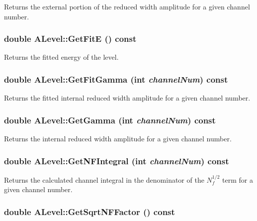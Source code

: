 Returns the external portion of the reduced width amplitude for a given channel number. 
\subsubsection{\setlength{\rightskip}{0pt plus 5cm}double ALevel::Get\-Fit\-E () const}\label{classALevel_c44f25d7d8117ae4602edaca92a8e2c8}


Returns the fitted energy of the level. 
\subsubsection{\setlength{\rightskip}{0pt plus 5cm}double ALevel::Get\-Fit\-Gamma (int {\em channel\-Num}) const}\label{classALevel_40c97f2b98a5462463d99eab30bc0759}


Returns the fitted internal reduced width amplitude for a given channel number. 
\subsubsection{\setlength{\rightskip}{0pt plus 5cm}double ALevel::Get\-Gamma (int {\em channel\-Num}) const}\label{classALevel_d9a5bfa377381e871e873a0bf98ad34a}


Returns the internal reduced width amplitude for a given channel number. 
\subsubsection{\setlength{\rightskip}{0pt plus 5cm}double ALevel::Get\-NFIntegral (int {\em channel\-Num}) const}\label{classALevel_bf0c916fcfffe3bd2c6579e62f5187d8}


Returns the calculated channel integral in the denominator of the $N_f^{1/2} $ term for a given channel number. 
\subsubsection{\setlength{\rightskip}{0pt plus 5cm}double ALevel::Get\-Sqrt\-NFFactor () const}\label{classALevel_d30896b8e21011a2ebca8d2e2e634ca1}


